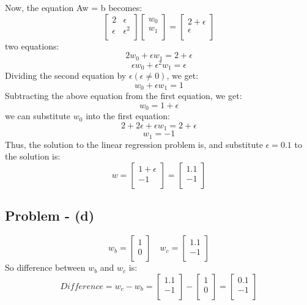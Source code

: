 \documentclass{article}
\begin{document}
Now, the equation Aw = b becomes:
\[
\begin{bmatrix}
    2 & \epsilon \\
    \epsilon & \epsilon^{2} \\
\end{bmatrix}
\begin{bmatrix}
    w_{0} \\
    w_{1} \\
\end{bmatrix}
=
\begin{bmatrix}
    2 + \epsilon\\
    \epsilon \\
\end{bmatrix}
\]
two equations:
\[
    2w_{0} + \epsilon w_{1} = 2 + \epsilon
\]
\[
    \epsilon w_{0} + \epsilon^{2} w_{1} = \epsilon
\]
Dividing the second equation by $\epsilon (\epsilon \neq 0)$, we get:
\[
    w_{0} + \epsilon w_{1} = 1
\]
Subtracting the above equation from the first equation, we get:
\[
    w_{0} = 1 + \epsilon
\]
we can substitute $w_{0}$ into the first equation:
\[
    2 + 2\epsilon + \epsilon w_{1} = 2 + \epsilon
\]
\[
    w_{1} = -1
\]
Thus, the solution to the linear regression problem is, and substitute $\epsilon = 0.1$ to the solution is:
\[
    w = \begin{bmatrix}
        1 + \epsilon \\
        -1 \\
    \end{bmatrix}
    = \begin{bmatrix}
        1.1 \\
        -1 \\
    \end{bmatrix}
\]



\subsection{Problem - (d)}
\[
w_{b} = \begin{bmatrix}
    1 \\
    0 \\ 
\end{bmatrix}
\hspace{1em}
w_{c} = \begin{bmatrix}
    1.1 \\
    -1 \\
\end{bmatrix}
\]
So difference between \( w_{b} \) and \( w_{c} \) is:
\[
Difference = w_{c} - w_{b} = \begin{bmatrix}
    1.1\\
    -1\\
\end{bmatrix}
-
\begin{bmatrix}
    1\\
    0\\
\end{bmatrix}
=   
\begin{bmatrix}
    0.1 \\
    -1 \\
\end{bmatrix}
\]
\end{document}
